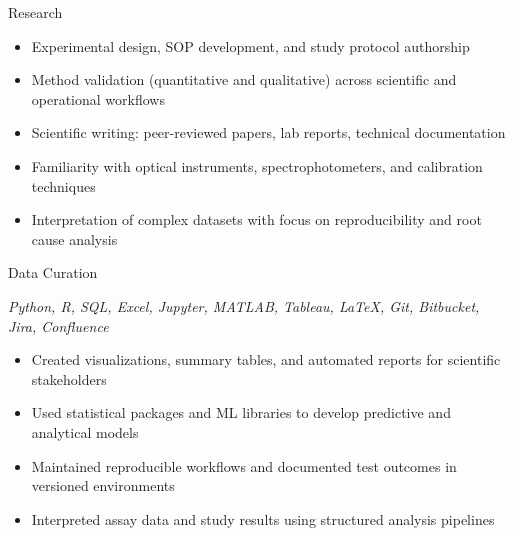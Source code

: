 
\begin{cvskills}    

    \cvskill
    {Research}
    {\begin{minipage}[t]{0.8\textwidth}
        \begin{itemize}
            \item Experimental design, SOP development, and study protocol authorship
            \item Method validation (quantitative and qualitative) across scientific and operational workflows
            \item Scientific writing: peer-reviewed papers, lab reports, technical documentation
            \item Familiarity with optical instruments, spectrophotometers, and calibration techniques
            \item Interpretation of complex datasets with focus on reproducibility and root cause analysis
        \end{itemize}
    \end{minipage}
    }

    \cvskill
    {Data Curation}
    {\begin{minipage}[t]{0.8\textwidth}
        \textit{Python, R, SQL, Excel, Jupyter, MATLAB, Tableau, LaTeX, Git, Bitbucket, Jira, Confluence}
        \begin{itemize}
            \item Created visualizations, summary tables, and automated reports for scientific stakeholders
            \item Used statistical packages and ML libraries to develop predictive and analytical models
            \item Maintained reproducible workflows and documented test outcomes in versioned environments
            \item Interpreted assay data and study results using structured analysis pipelines
        \end{itemize}
    \end{minipage}
    }


\end{cvskills}
